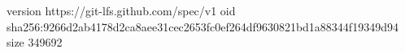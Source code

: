 version https://git-lfs.github.com/spec/v1
oid sha256:9266d2ab4178d2ca8aee31cec2653fc0ef264df9630821bd1a88344f19349d94
size 349692

